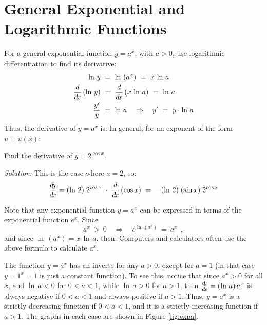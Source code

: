 \section{General Exponential and Logarithmic Functions}
For a general exponential function $y = a^x$, with $a > 0$, use logarithmic
differentiation to find its derivative:
\begin{align*}
 \ln\,y ~&=~ \ln\,\left(a^x\right) ~=~ x \,\ln\,a\\
 \frac{d}{d\!x}\,(\ln\,y) ~&=~ \frac{d}{d\!x}\,(x \,\ln\,a) ~=~ \ln\,a\\
 \frac{y'}{y} ~&=~ \ln\,a \quad\Rightarrow\quad y' ~=~ y \cdot \ln\,a
\end{align*}
Thus, the derivative of $y = a^x$ is:
In general, for an exponent of the form $u = u(x)$:

\begin{exmp}
Find the derivative of $y = 2^{\cos x}$.\vspace{1mm}
\par\noindent\emph{Solution:} This is the case where $a = 2$, so:
\[
\frac{d\negmedspace y}{d\!x} = (\ln\,2)\;2^{\cos x} \;\cdot\; \frac{d}{d\!x}\,(\cos x)
~=~ -(\ln\,2)\;(\sin x)\;2^{\cos x}
\]
\end{exmp}
\divider
\vspace{3mm}

Note that any exponential function $y = a^x$ can be expressed in terms of the
exponential function $e^x$. Since
\[
a^x ~>~ 0 \quad\Rightarrow\quad e^{\ln\,(a^x)} ~=~ a^x ~~,
\]
and since $\ln\,(a^x) = x\,\ln\,a$, then:
\statecomment{\vspace{-1mm}\[ a^x ~=~ e^{x\,\ln\,a} \]}
Computers and calculators often use the above formula to calculate $a^x$.

The function $y = a^x$ has an inverse for any $a > 0$, except for $a = 1$ (in
that case $y = 1^x = 1$ is just a constant function). To see this, notice that
since $a^x > 0$ for all $x$, and $\ln\,a < 0$ for $0 < a < 1$, while
$\ln\,a > 0$ for $a > 1$, then $\frac{d\negmedspace y}{d\!x} = (\ln\,a)\,a^x$ is always negative if
$0 < a < 1$ and always positive if $a > 1$. Thus, $y = a^x$ is a
strictly decreasing function if $0 < a < 1$, and it is a strictly increasing
function if $a > 1$. The graphs in each case are shown in Figure \ref{fig:expa}.

